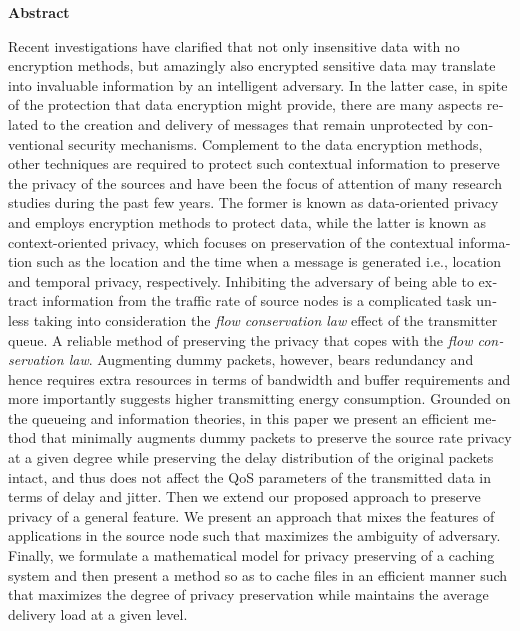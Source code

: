 \thispagestyle{empty} %
\begin{latin} %

\centerline{\textbf{\large{Abstract}}}
\vskip 1cm
 
Recent  investigations have clarified that not only insensitive data with no encryption methods, but amazingly also encrypted sensitive data may translate into invaluable information by an intelligent adversary. In the latter case, in spite of the protection that data encryption might
provide, there are many aspects related to the creation and delivery of messages that remain
unprotected by conventional security mechanisms. Complement to the data encryption methods,
other techniques are required to protect such contextual information to preserve the privacy of the
sources and have been the focus of attention of many research studies during the past few years. The former is known as data-oriented privacy and employs encryption methods to
protect data, while the latter is known as context-oriented privacy, which focuses on preservation
of the contextual information such as the location and the time when a message is generated
i.e., location and temporal privacy, respectively. 
 Inhibiting the adversary of being able to extract information from the traffic rate of source nodes is a complicated task unless taking into consideration the \emph{flow conservation law} effect of the transmitter queue. A reliable method of preserving the privacy that copes with the \emph{flow conservation law}. Augmenting dummy packets, however, bears redundancy and hence requires extra resources in terms of bandwidth and buffer requirements and more importantly suggests higher transmitting energy consumption. Grounded on the queueing and information theories, in this paper we present an efficient method that minimally augments dummy packets to preserve the source rate privacy at a given degree while preserving the delay distribution of the original packets intact, and thus does not affect the QoS parameters of the transmitted data in terms of delay and jitter. Then we extend our proposed approach to preserve privacy of a general feature. We present an approach that mixes the features of applications in the source node such
that maximizes the ambiguity of adversary. Finally, we formulate a mathematical model for privacy preserving of a caching system and then present a method so as to cache
files in an efficient manner such that maximizes the degree of
privacy preservation while maintains the average delivery load at
a given level.

\end{latin}
